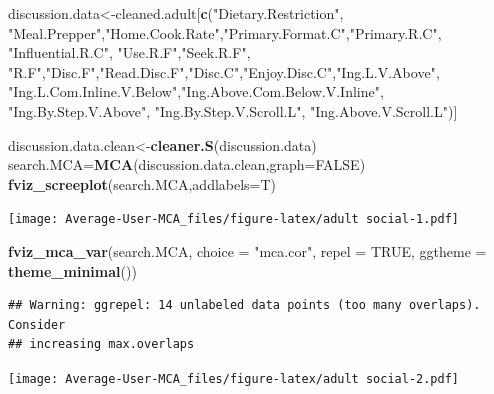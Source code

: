 \documentclass[
]{article}
\newenvironment{Shaded}{\begin{snugshade}}{\end{snugshade}}
\newcommand{\DataTypeTok}[1]{\textcolor[rgb]{0.13,0.29,0.53}{#1}}
\newcommand{\KeywordTok}[1]{\textcolor[rgb]{0.13,0.29,0.53}{\textbf{#1}}}
\newcommand{\NormalTok}[1]{#1}
\newcommand{\OtherTok}[1]{\textcolor[rgb]{0.56,0.35,0.01}{#1}}
\newcommand{\StringTok}[1]{\textcolor[rgb]{0.31,0.60,0.02}{#1}}
\begin{document}
\begin{Shaded}
\begin{Highlighting}[]
\NormalTok{discussion.data<-cleaned.adult[}\KeywordTok{c}\NormalTok{(}\StringTok{"Dietary.Restriction"}\NormalTok{, }\StringTok{"Meal.Prepper"}\NormalTok{,}\StringTok{"Home.Cook.Rate"}\NormalTok{,}\StringTok{"Primary.Format.C"}\NormalTok{,}\StringTok{"Primary.R.C"}\NormalTok{, }\StringTok{"Influential.R.C"}\NormalTok{, }
            \StringTok{"Use.R.F"}\NormalTok{,}\StringTok{"Seek.R.F"}\NormalTok{, }\StringTok{"R.F"}\NormalTok{,}\StringTok{"Disc.F"}\NormalTok{,}\StringTok{"Read.Disc.F"}\NormalTok{,}\StringTok{"Disc.C"}\NormalTok{,}\StringTok{"Enjoy.Disc.C"}\NormalTok{,}\StringTok{"Ing.L.V.Above"}\NormalTok{,}
            \StringTok{"Ing.L.Com.Inline.V.Below"}\NormalTok{,}\StringTok{"Ing.Above.Com.Below.V.Inline"}\NormalTok{,  }\StringTok{"Ing.By.Step.V.Above"}\NormalTok{,  }\StringTok{"Ing.By.Step.V.Scroll.L"}\NormalTok{,}
            \StringTok{"Ing.Above.V.Scroll.L"}\NormalTok{)]}

\NormalTok{discussion.data.clean<-}\KeywordTok{cleaner.S}\NormalTok{(discussion.data)}
\NormalTok{search.MCA=}\KeywordTok{MCA}\NormalTok{(discussion.data.clean,}\DataTypeTok{graph=}\OtherTok{FALSE}\NormalTok{)}
\KeywordTok{fviz_screeplot}\NormalTok{(search.MCA,}\DataTypeTok{addlabels=}\NormalTok{T)}
\end{Highlighting}
\end{Shaded}

\texttt{[image: Average-User-MCA\_files/figure-latex/adult social-1.pdf]}

\begin{Shaded}
\begin{Highlighting}[]
\KeywordTok{fviz_mca_var}\NormalTok{(search.MCA, }\DataTypeTok{choice =} \StringTok{"mca.cor"}\NormalTok{, }\DataTypeTok{repel =} \OtherTok{TRUE}\NormalTok{,}
             \DataTypeTok{ggtheme =} \KeywordTok{theme_minimal}\NormalTok{())}
\end{Highlighting}
\end{Shaded}

\begin{verbatim}
## Warning: ggrepel: 14 unlabeled data points (too many overlaps). Consider
## increasing max.overlaps
\end{verbatim}

\texttt{[image: Average-User-MCA\_files/figure-latex/adult social-2.pdf]}

\begin{Shaded}
\end{Shaded}
\end{document}
